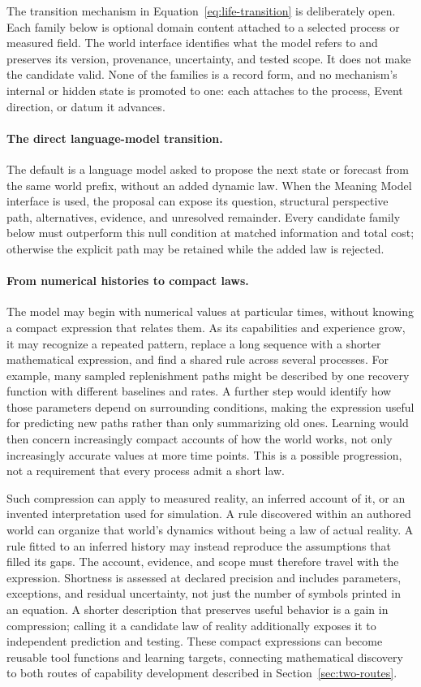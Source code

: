 \documentclass[10pt]{article}
\begin{document}
The transition mechanism in Equation~\ref{eq:life-transition} is deliberately
open. Each family below is optional domain content attached to a selected
process or measured field. The world interface identifies what the model refers
to and preserves its version, provenance, uncertainty, and tested scope. It
does not make the candidate valid. None of the families is a record form, and no
mechanism's internal or hidden state is promoted to one: each attaches to the
process, Event direction, or datum it advances.

\paragraph{The direct language-model transition.}
The default is a language model asked to propose the next state or forecast
from the same world prefix, without an added dynamic law. When the Meaning
Model interface is used, the proposal can expose its question, structural
perspective path,
alternatives, evidence, and unresolved remainder. Every candidate family below
must outperform this null condition at matched information and total cost;
otherwise the explicit path may be retained while the added law is rejected.

\paragraph{From numerical histories to compact laws.}
The model may begin with numerical values at particular times, without knowing
a compact expression that relates them. As its capabilities and experience
grow, it may recognize a repeated pattern, replace a long sequence with a
shorter mathematical expression, and find a shared rule across several
processes. For example, many sampled replenishment paths might be described
by one recovery function with different baselines and rates. A further step
would identify how those parameters depend on surrounding conditions, making
the expression useful for predicting new paths rather than only summarizing
old ones. Learning would then concern increasingly compact accounts of how
the world works, not only increasingly accurate values at more time points.
This is a possible progression, not a requirement that every process admit a
short law.

Such compression can apply to measured reality, an inferred account of it,
or an invented interpretation used for simulation. A rule discovered within
an authored world can organize that world's dynamics without being a law of
actual reality. A rule fitted to an inferred history may instead reproduce
the assumptions that filled its gaps. The account, evidence, and scope must
therefore travel with the expression. Shortness is assessed at declared
precision and includes parameters, exceptions, and residual uncertainty, not
just the number of symbols printed in an equation. A shorter description that
preserves useful behavior is a gain in compression; calling it a candidate
law of reality additionally exposes it to independent prediction and testing.
These compact expressions can become reusable tool functions and learning
targets, connecting mathematical discovery to both routes of capability
development described in Section~\ref{sec:two-routes}.
\end{document}
